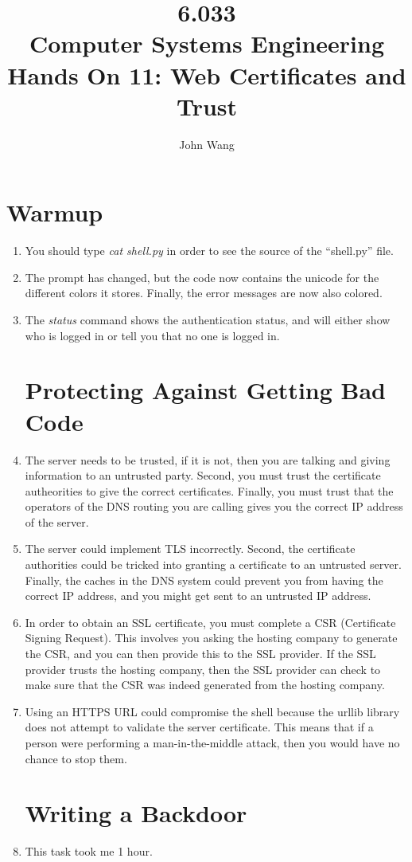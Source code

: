 \documentclass[psamsfonts]{amsart}
\title{6.033 \\
Computer Systems Engineering \\
Hands On 11: Web Certificates and Trust}
\author{John Wang}
\begin{document}
\maketitle

\section{Warmup}

\begin{enumerate}
  \item You should type \emph{cat shell.py} in order to see the source of the ``shell.py'' file.
  \item The prompt has changed, but the code now contains the unicode for the different colors it stores. Finally, the error messages are now also colored.
  \item The \emph{status} command shows the authentication status, and will either show who is logged in or tell you that no one is logged in.
    \section{Protecting Against Getting Bad Code}

  \item The server needs to be trusted, if it is not, then you are talking and giving information to an untrusted party. Second, you must trust the certificate autheorities to give the correct certificates. Finally, you must trust that the operators of the DNS routing you are calling gives you the correct IP address of the server.
  \item The server could implement TLS incorrectly. Second, the certificate authorities could be tricked into granting a certificate to an untrusted server. Finally, the caches in the DNS system could prevent you from having the correct IP address, and you might get sent to an untrusted IP address.
  \item In order to obtain an SSL certificate, you must complete a CSR (Certificate Signing Request). This involves you asking the hosting company to generate the CSR, and you can then provide this to the SSL provider. If the SSL provider trusts the hosting company, then the SSL provider can check to make sure that the CSR was indeed generated from the hosting company.
  \item Using an HTTPS URL could compromise the shell because the urllib library does not attempt to validate the server certificate. This means that if a person were performing a man-in-the-middle attack, then you would have no chance to stop them.
    \section{Writing a Backdoor}
  \item This task took me 1 hour.
\end{enumerate}
\end{document}

